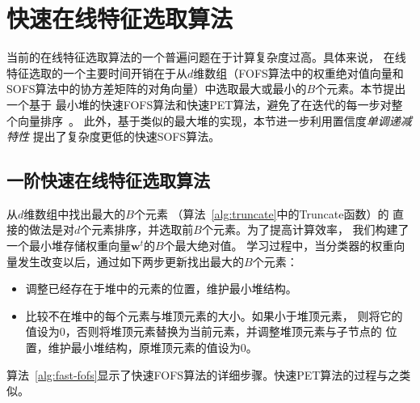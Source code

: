 \documentclass[doctor]{ustcthesis}
\def \w  {\mathbf{w}}
\begin{document}
\vspace{-1em}
\section{快速在线特征选取算法}
当前的在线特征选取算法的一个普遍问题在于计算复杂度过高。具体来说，
在线特征选取的一个主要时间开销在于从$d$维数组（FOFS算法中的权重绝对值向量和
SOFS算法中的协方差矩阵的对角向量）中选取最大或最小的$B$个元素。本节提出一个基于
最小堆的快速FOFS算法和快速PET算法，避免了在迭代的每一步对整个向量排序~\cite{wang2014online}。
此外，基于类似的最大堆的实现，本节进一步利用置信度\emph{单调递减特性}
提出了复杂度更低的快速SOFS算法。

\subsection{一阶快速在线特征选取算法}
从$d$维数组中找出最大的$B$个元素 （算法~\ref{alg:truncate}中的Truncate函数）的
直接的做法是对$d$个元素排序，并选取前$B$个元素。为了提高计算效率，
我们构建了一个最小堆存储权重向量$\w^t$的$B$个最大绝对值。
学习过程中，当分类器的权重向量发生改变以后，通过如下两步更新找出最大的$B$个元素：
\vspace{-0.3em}
\begin{itemize}\setlength{\itemsep}{-0.5em}
    \item 调整已经存在于堆中的元素的位置，维护最小堆结构。
    \item 比较不在堆中的每个元素与堆顶元素的大小。如果小于堆顶元素，
        则将它的值设为0，否则将堆顶元素替换为当前元素，并调整堆顶元素与子节点的
        位置，维护最小堆结构，原堆顶元素的值设为0。
\end{itemize}

算法~\ref{alg:fast-fofs}显示了快速FOFS算法的详细步骤。快速PET算法的过程与之类似。
\end{document}
